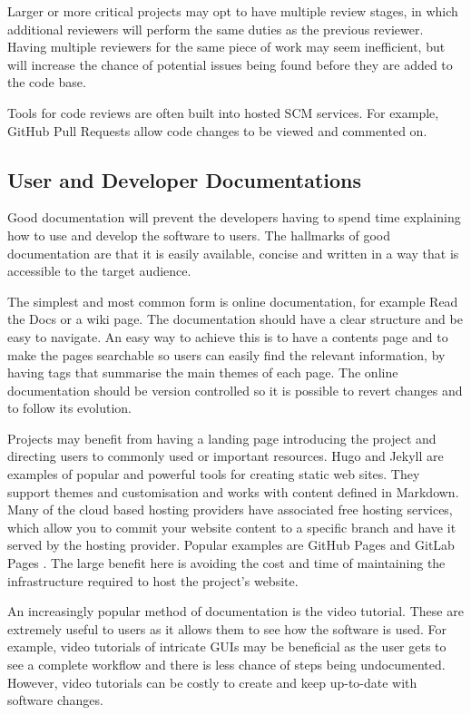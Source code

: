 \documentclass[jnr]{iosart2x}
\begin{document}
Larger or more critical projects may opt to have multiple review stages, in which additional reviewers will perform the same duties as the previous reviewer.
Having multiple reviewers for the same piece of work may seem inefficient, but will increase the chance of potential issues being found before they are added to the code base.

Tools for code reviews are often built into hosted SCM services.
For example, GitHub Pull Requests allow code changes to be viewed and commented on.

\subsection{User and Developer Documentations}
\label{Documentation}

Good documentation will prevent the developers having to spend time explaining how to use and develop the software to users.
The hallmarks of good documentation are that it is easily available, concise and written in a way that is accessible to the target audience.

The simplest and most common form is online documentation, for example Read the Docs \cite{Read_The_Docs} or a wiki page.
The documentation should have a clear structure and be easy to navigate.
An easy way to achieve this is to have a contents page and to make the pages searchable so users can easily find the relevant information, by having tags that summarise the main themes of each page.
The online documentation should be version controlled so it is possible to revert changes and to follow its evolution.

Projects may benefit from having a landing page introducing the project and directing users to commonly used or important resources.
Hugo \cite{Hugo} and Jekyll \cite{Jekyll} are examples of popular and powerful tools for creating static web sites.
They support themes and customisation and works with content defined in Markdown.
Many of the cloud based hosting providers have associated free hosting services, which allow you to commit your website content to a specific branch and have it served by the hosting provider. 
Popular examples are GitHub Pages \cite{GitHub_Pages} and GitLab Pages \cite{GitLab_Pages}. 
The large benefit here is avoiding the cost and time of maintaining the infrastructure required to host the project's website.

An increasingly popular method of documentation is the video tutorial.
These are extremely useful to users as it allows them to see how the software is used.
For example, video tutorials of intricate GUIs may be beneficial as the user gets to see a complete workflow and there is less chance of steps being undocumented.
However, video tutorials can be costly to create and keep up-to-date with software changes.
\end{document}
